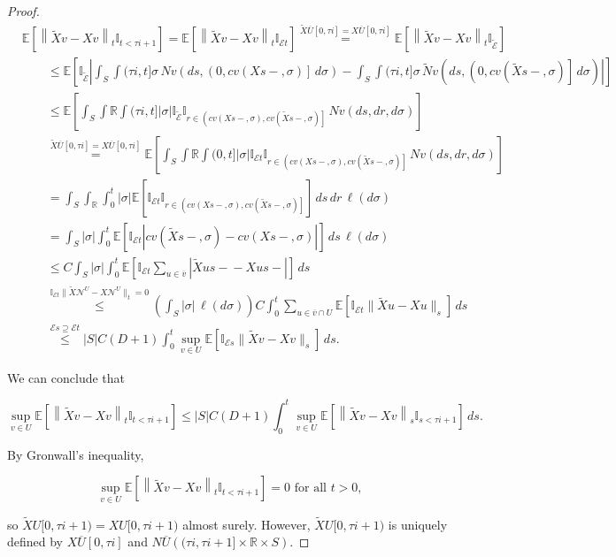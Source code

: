 \documentclass[12pt]{article}
\newcommand{\mb}{\mathbb}
\newcommand{\mc}{\mathcal}
\newcommand{\ov}{\overline}
\newcommand{\os}{\overset}
\newcommand{\te}{\text}
\newcommand{\ind}{\hspace{24pt}}
\newcommand{\ex}[1]{\mb{E}\left[#1\right]}			%
\renewcommand{\v}{v}							%
\newcommand{\vv}{u}								%
\renewcommand{\U}{U}							%
\renewcommand{\S}{S}							%
\newcommand{\s}{\sigma}							%
\renewcommand{\t}{t}							%
\renewcommand{\tt}{s}							%
\newcommand{\X}{X}								%
\newcommand{\IGr}{c}							%
\newcommand{\neigh}{\mc{N}}						%
\newcommand{\vind}[1]{^{#1}}					%
\newcommand{\cl}{\ov}							%
\newcommand{\const}{C}							%
\newcommand{\degr}{D}							%
\newcommand{\poiss}{N}							%
\newcommand{\Sm}{\ell}							%
\renewcommand{\r}{r}							%
\newcommand{\alt}[1]{\widetilde{#1}}			%
\newcommand{\rt}{\tau}							%
\newcommand{\evnt}{\mc{E}}						%
\begin{document}
\begin{proof}
\begin{align*}
&\ex{\left\|\alt{\X}{\v}{} - \X{\v}{}\right\|_{\t}\mb{I}_{\t < \rt{i+1}}} = \ex{\left\|\alt{\X}{\v}{} - \X{\v}{}\right\|_{\t}\mb{I}_{\evnt{\t}}}\os{\alt{\X}{\cl{\U}}{}[0,\rt{i}] = \X{\cl{\U}}{[0,\rt{i}]}}{=} \ex{\left\|\alt{\X}{\v}{} - \X{\v}{}\right\|_{\t}\mb{I}_{\alt{\evnt}{	}}}\\
&\ind\leq \ex{\mb{I}_{\alt{\evnt}{	}}\left|\int_\S\int{(\rt{i},\t]} \s\,\poiss{\v}\left(d\tt,\left(0,\IGr{\v}(\X{}{\tt-},\s)\right]\,d\s\right) - \int_\S\int{(\rt{i},\t]} \s\,\alt{\poiss}{\v}\left(d\tt,\left(0,\IGr{\v}(\alt{\X}{}{\tt-},\s)\right]\,d\s\right)\right|}\\
&\ind \leq \ex{\int_\S\int{\mb{R}}\int{(\rt{i},\t]}|\s|\mb{I}_{\alt{\evnt}{	}}\mb{I}_{\r\in \left(\IGr{\v}(\X{}{\tt-},\s), \IGr{\v}(\alt{\X}{}{\tt-},\s)\right]}\,\poiss{\v}\left(d\tt,d\r,d\s\right)}\\
&\ind \os{\alt{\X}{\cl{\U}}{}[0,\rt{i}] = \X{\cl{\U}}{[0,\rt{i}]}}{=} \ex{\int_\S\int{\mb{R}}\int{(0,\t]}|\s|\mb{I}_{\evnt{\t}}\mb{I}_{\r\in \left(\IGr{\v}(\X{}{\tt-},\s), \IGr{\v}(\alt{\X}{}{\tt-},\s)\right]}\,\poiss{\v}\left(d\tt,d\r,d\s\right)}\\
&\ind = \int_\S\int_\mb{R}\int_0^\t |\s|\ex{\mb{I}_{\evnt{\t}}\mb{I}_{\r\in\left(\IGr{\v}(\X{}{\tt-},\s),\IGr{\v}(\alt{\X}{}{\tt-},\s)\right]}}\,d\tt\,d\r\,\Sm(d\s)\\
&\ind = \int_\S |\s|\int_0^\t \ex{\mb{I}_{\evnt{\t}}\left|\IGr{\v}(\alt{\X}{}{\tt-},\s) - \IGr{\v}(\X{}{\tt-},\s)\right|}\,d\tt\,\Sm(d\s)\\
&\ind \leq \const{}\int_\S|\s|\int_0^\t\ex{\mb{I}_{\evnt{\t}}\sum_{\vv\in \cl{\v}}\left|\alt{\X}{\vv}{\tt-} - \X{\vv}{\tt-}\right|}\,d\tt\\
&\ind \os{\mb{I}_{\evnt{\t}}\|\alt{\X}{\neigh\vind{\U}}{} - \X{\neigh\vind{\U}}{}\|_\t = 0}{\leq} \left(\int_\S|\s|\,\Sm(d\s)\right)\const{} \int_0^\t \sum_{\vv\in \cl{\v}\cap\U}\ex{\mb{I}_{\evnt{\t}}\|\alt{\X}{\vv}{} - \X{\vv}{}\|_\tt}\,d\tt\\
&\ind \os{\evnt{\tt} \supseteq \evnt{\t}}{\leq} |\S|\const{}(\degr+1) \int_0^\t \sup_{\v\in \U}\ex{\mb{I}_{\evnt{\tt}}\|\alt{\X}{\v}{} - \X{\v}{}\|_\tt}\,d\tt.
\end{align*}

We can conclude that

\[\sup_{\v\in \U}\ex{\left\|\alt{\X}{\v}{} - \X{\v}{}\right\|_{\t}\mb{I}_{\t <\rt{i+1}}} \leq |\S|\const{}(\degr+1)\int_0^\t\sup_{v\in\U}\ex{\left\|\alt{\X}{\v}{} - \X{\v}{}\right\|_\tt\mb{I}_{\tt < \rt{i+1}}}\,d\tt.\]

By Gronwall's inequality,

\[\sup_{v\in \U}\ex{\left\|\alt{\X}{\v}{} - \X{\v}{}\right\|_\t\mb{I}_{\t < \rt{i+1}}} = 0 \te{ for all } \t > 0,\]

so \(\alt{\X}{\U}{}[0,\rt{i+1}) = \X{\U}{[0,\rt{i+1})}\) almost surely. However, \(\alt{\X}{\U}{}[0,\rt{i+1})\) is uniquely defined by \(\X{\cl{\U}}{[0,\rt{i}]}\) and \(\poiss{\cl{\U}}\left((\rt{i},\rt{i+1}]\times \mb{R}\times \S\right)\).
\end{proof}
\end{document}
